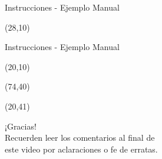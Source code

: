 \documentclass[aspectratio=169]{beamer}
\begin{document}
\begin{frame}[t,fragile]{Instrucciones - Ejemplo Manual}
    \begin{textblock}{25}(28,10)
    \end{textblock}
\end{frame}

\begin{frame}[t,fragile]{Instrucciones - Ejemplo Manual}
    \begin{textblock}{25}(20,10)
    \end{textblock}
    \begin{textblock}{50}(74,40)
    \end{textblock}
    \begin{textblock}{25}(20,41)
    \end{textblock}
\end{frame}


\begin{frame}[plain]
    \begin{center}
    \vspace{2cm}
    \huge ¡Gracias!\\
    \vspace{2cm}
    \normalsize Recuerden leer los comentarios al final de \\ este video por aclaraciones o fe de erratas.
    \end{center}
\end{frame}
\end{document}
